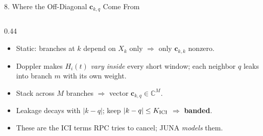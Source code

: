 \documentclass[aspectratio=169,10pt]{beamer}
\newcommand{\vc}{\bm{c}}
\newcommand{\Cx}{\mathbb{C}}
\begin{document}
\begin{frame}{8. Where the Off-Diagonal $\vc_{k,q}$ Come From}

  \begin{columns}[T,onlytextwidth]
    \begin{column}{0.44\textwidth}
      \begin{itemize}\setlength{\itemsep}{0.22em}
        \item Static: branches at $k$ depend on $X_k$ only $\Rightarrow$ only $\vc_{k,k}$ nonzero.
        \item Doppler makes $H_i(t)$ \emph{vary inside} every short window; each neighbor $q$ leaks into branch $m$ with its own weight.
        \item Stack across $M$ branches $\Rightarrow$ vector $\vc_{k,q}\in\Cx^{M}$.
        \item Leakage decays with $|k-q|$; keep $|k-q|\le K_{\rm ICI}$ $\Rightarrow$ \textbf{banded}.
        \item These are the ICI terms RPC tries to cancel; JUNA \emph{models} them.
      \end{itemize}
    \end{column}


\end{columns}
\end{frame}
\end{document}
